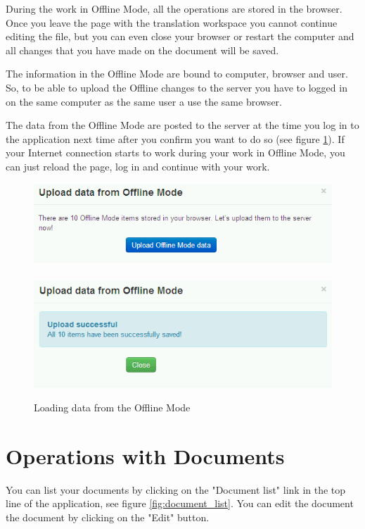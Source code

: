 During the work in Offline Mode, all the operations are stored in the browser. Once you leave the page with the translation workspace you cannot continue editing the file, but you can even close your browser or restart the computer and all changes that you have made on the document will be saved.

The information in the Offline Mode are bound to computer, browser and user. So, to be able to upload the Offline changes to the server you have to logged in on the same computer as the same user a use the same browser.

The data from the Offline Mode are posted to the server at the time you log in to the application next time after you confirm you want to do so (see figure \ref{fig:offline_loading}). If your Internet connection starts to work during your work in Offline Mode, you can just reload the page, log in and continue with your work.

\begin{figure}[h]
\begin{center}
\includegraphics[scale=0.4]{figures/user_manual/upload_offline_mode.png}~~~~\includegraphics[scale=0.4]{figures/user_manual/upload_offline_mode_success.png}
\end{center}
\caption{Loading data from the Offline Mode}
\label{fig:offline_loading}
\end{figure}

\section{Operations with Documents}

You can list your documents by clicking on the "Document list" link in the top line of the application, see figure \ref{fig:document_list}. You can edit the document the document by clicking on the "Edit" button.

